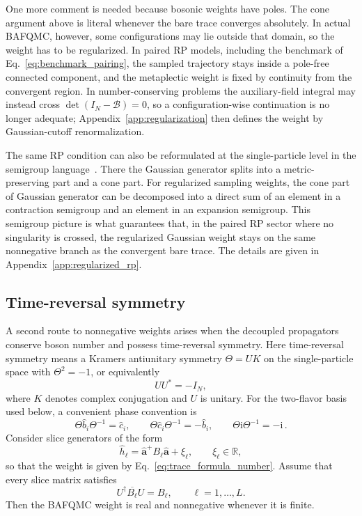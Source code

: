 \documentclass[twocolumn,aps,prb,10pt,amsmath,amssymb,amsthm,superscriptaddress]{revtex4-2}
\newcommand{\ii}{\mathrm{i}}
\newcommand{\hc}{\dagger}
\newcommand{\mc}[1]{\mathcal{#1}}
\newcommand{\bb}[1]{\bm{#1}}
\theoremstyle{remark}
\begin{document}
One more comment is needed because bosonic weights have poles. The cone argument above is literal whenever the bare trace converges absolutely. In actual BAFQMC, however, some configurations may lie outside that domain, so the weight has to be regularized. In paired RP models, including the benchmark of Eq.~\eqref{eq:benchmark_pairing}, the sampled trajectory stays inside a pole-free connected component, and the metaplectic weight is fixed by continuity from the convergent region. In number-conserving problems the auxiliary-field integral may instead cross $\det(I_N-\mc B)=0$, so a configuration-wise continuation is no longer adequate; Appendix~\ref{app:regularization} then defines the weight by Gaussian-cutoff renormalization.

The same RP condition can also be reformulated at the single-particle level in the semigroup language~\cite{wei2024prb}. There the Gaussian generator splits into a metric-preserving part and a cone part. For regularized sampling weights, the cone part of Gaussian generator can be decomposed into a direct sum of an element in a contraction semigroup and an element in an expansion semigroup. This semigroup picture is what guarantees that, in the paired RP sector where no singularity is crossed, the regularized Gaussian weight stays on the same nonnegative branch as the convergent bare trace. The details are given in Appendix~\ref{app:regularized_rp}.

\subsection{Time-reversal symmetry}
\label{sec:trs}

A second route to nonnegative weights arises when the decoupled propagators conserve boson number and possess time-reversal symmetry. Here time-reversal symmetry means a Kramers antiunitary symmetry $\Theta=UK$ on the single-particle space with $\Theta^2=-1$, or equivalently
\begin{equation}
    U U^* = -I_N,
    \label{eq:kramers_condition}
\end{equation}
where $K$ denotes complex conjugation and $U$ is unitary. For the two-flavor basis used below, a convenient phase convention is
\begin{equation}
    \Theta\hat b_i\Theta^{-1} = \hat c_i,
    \qquad
    \Theta\hat c_i\Theta^{-1} = -\hat b_i,
    \qquad
    \Theta\ii\Theta^{-1} = -\ii \, .
    \label{eq:trs_action_operator}
\end{equation}
Consider slice generators of the form
\begin{equation}
    \hat h_\ell = \hat{\bb a}^+ B_\ell \hat{\bb a} + \xi_\ell,
    \qquad
    \xi_\ell\in\mathbb R,
    \label{eq:antiunitary_slice}
\end{equation}
so that the weight is given by Eq.~\eqref{eq:trace_formula_number}. Assume that every slice matrix satisfies
\begin{equation}
    U^\hc \overline{B_\ell} U = B_\ell,
    \qquad \ell=1,\ldots,L.
    \label{eq:Bsymmetry}
\end{equation}
Then the BAFQMC weight is real and nonnegative whenever it is finite.
\end{document}
